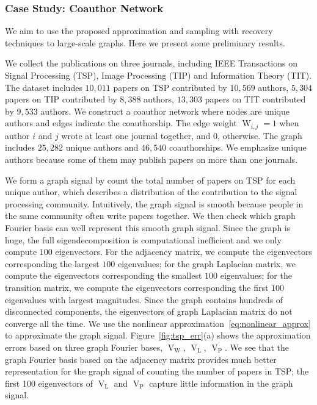 \documentclass[journal,twocolumn,10pt]{IEEEtran}
\theoremstyle{definition}
\DeclareMathOperator{\LL}{L}
\DeclareMathOperator{\Pj}{P}
\DeclareMathOperator{\Vm}{V}
\DeclareMathOperator{\W}{W}
\begin{document}
\subsubsection{Case Study: Coauthor Network}
We aim to use the proposed approximation and sampling with recovery techniques to large-scale graphs. Here we present some preliminary results.



We collect the publications on three journals, including IEEE Transactions on Signal Processing (TSP), Image Processing (TIP) and Information Theory (TIT). The dataset includes $10,011$ papers on TSP contributed by $10,569$ authors, $5,304$ papers on TIP contributed by $8,388$ authors,  $13,303$ papers on TIT contributed by $9,533$ authors. We construct a coauthor network where nodes are unique authors and edges indicate the coauthorship. The edge weight $\W_{i,j}= 1$ when author $i$ and $j$ wrote at least one journal together, and $0$, otherwise.  The graph includes $25,282$ unique authors and $46,540$ coauthorships. We emphasize unique authors because some of them may publish papers on more than one journals. 

We form a graph signal by count the total number of papers on TSP for each unique author, which describes a distribution of the contribution to the signal processing community. Intuitively, the graph signal is smooth because people in the same community often write papers together. We then check which graph Fourier basis can well represent this smooth graph signal. Since the graph is huge, the full eigendecomposition is computational inefficient and we only compute $100$ eigenvectors. For the adjacency matrix, we compute the eigenvectors corresponding the largest $100$ eigenvalues; for the graph Laplacian matrix, we compute the eigenvectors corresponding the smallest $100$ eigenvalues; for the transition matrix, we compute the eigenvectors corresponding the first $100$ eigenvalues with largest magnitudes. Since the graph contains hundreds of disconnected components, the eigenvectors of graph Laplacian matrix do not converge all the time. We use the nonlinear approximation~\eqref{eq:nonlinear_approx} to approximate the graph signal. Figure~\ref{fig:tsp_err}(a) shows the approximation errors based on three graph Fourier bases, $\Vm_{\W}$, $\Vm_{\LL}$, $\Vm_{\Pj}$. We see that the graph Fourier basis based on the adjacency matrix provides much better representation for the graph signal of counting the number of papers in TSP; the first 100 eigenvectors of $\Vm_{\LL}$ and $\Vm_{\Pj}$ capture little information in the graph signal. 
\end{document}
